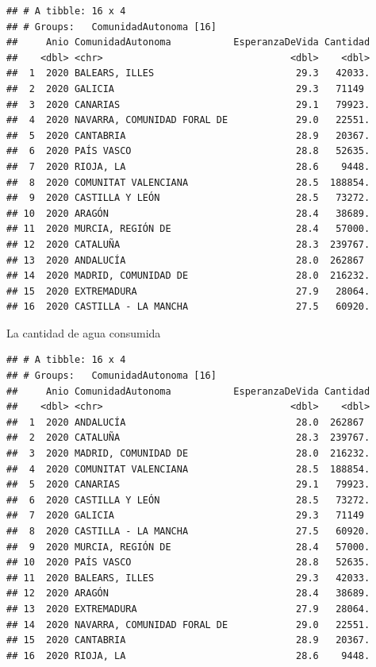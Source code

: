 \documentclass[
]{article}
\newenvironment{Shaded}{\begin{snugshade}}{\end{snugshade}}
\newcommand{\FunctionTok}[1]{\textcolor[rgb]{0.13,0.29,0.53}{\textbf{#1}}}
\newcommand{\NormalTok}[1]{#1}
\newcommand{\OtherTok}[1]{\textcolor[rgb]{0.56,0.35,0.01}{#1}}
\newcommand{\SpecialCharTok}[1]{\textcolor[rgb]{0.81,0.36,0.00}{\textbf{#1}}}
\begin{document}
\begin{verbatim}
## # A tibble: 16 x 4
## # Groups:   ComunidadAutonoma [16]
##     Anio ComunidadAutonoma           EsperanzaDeVida Cantidad
##    <dbl> <chr>                                 <dbl>    <dbl>
##  1  2020 BALEARS, ILLES                         29.3   42033.
##  2  2020 GALICIA                                29.3   71149 
##  3  2020 CANARIAS                               29.1   79923.
##  4  2020 NAVARRA, COMUNIDAD FORAL DE            29.0   22551.
##  5  2020 CANTABRIA                              28.9   20367.
##  6  2020 PAÍS VASCO                             28.8   52635.
##  7  2020 RIOJA, LA                              28.6    9448.
##  8  2020 COMUNITAT VALENCIANA                   28.5  188854.
##  9  2020 CASTILLA Y LEÓN                        28.5   73272.
## 10  2020 ARAGÓN                                 28.4   38689.
## 11  2020 MURCIA, REGIÓN DE                      28.4   57000.
## 12  2020 CATALUÑA                               28.3  239767.
## 13  2020 ANDALUCÍA                              28.0  262867 
## 14  2020 MADRID, COMUNIDAD DE                   28.0  216232.
## 15  2020 EXTREMADURA                            27.9   28064.
## 16  2020 CASTILLA - LA MANCHA                   27.5   60920.
\end{verbatim}

La cantidad de agua consumida

\begin{Shaded}
\end{Shaded}

\begin{verbatim}
## # A tibble: 16 x 4
## # Groups:   ComunidadAutonoma [16]
##     Anio ComunidadAutonoma           EsperanzaDeVida Cantidad
##    <dbl> <chr>                                 <dbl>    <dbl>
##  1  2020 ANDALUCÍA                              28.0  262867 
##  2  2020 CATALUÑA                               28.3  239767.
##  3  2020 MADRID, COMUNIDAD DE                   28.0  216232.
##  4  2020 COMUNITAT VALENCIANA                   28.5  188854.
##  5  2020 CANARIAS                               29.1   79923.
##  6  2020 CASTILLA Y LEÓN                        28.5   73272.
##  7  2020 GALICIA                                29.3   71149 
##  8  2020 CASTILLA - LA MANCHA                   27.5   60920.
##  9  2020 MURCIA, REGIÓN DE                      28.4   57000.
## 10  2020 PAÍS VASCO                             28.8   52635.
## 11  2020 BALEARS, ILLES                         29.3   42033.
## 12  2020 ARAGÓN                                 28.4   38689.
## 13  2020 EXTREMADURA                            27.9   28064.
## 14  2020 NAVARRA, COMUNIDAD FORAL DE            29.0   22551.
## 15  2020 CANTABRIA                              28.9   20367.
## 16  2020 RIOJA, LA                              28.6    9448.
\end{verbatim}
\end{document}
